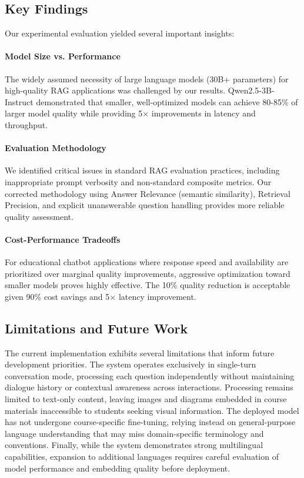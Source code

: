 \documentclass[12pt,a4paper]{article}
\begin{document}
\subsection{Key Findings}
Our experimental evaluation yielded several important insights:

\paragraph{Model Size vs. Performance} The widely assumed necessity of large language models (30B+ parameters) for high-quality RAG applications was challenged by our results. Qwen2.5-3B-Instruct demonstrated that smaller, well-optimized models can achieve 80-85\% of larger model quality while providing 5$\times$ improvements in latency and throughput.

\paragraph{Evaluation Methodology} We identified critical issues in standard RAG evaluation practices, including inappropriate prompt verbosity and non-standard composite metrics. Our corrected methodology using Answer Relevance (semantic similarity), Retrieval Precision, and explicit unanswerable question handling provides more reliable quality assessment.

\paragraph{Cost-Performance Tradeoffs} For educational chatbot applications where response speed and availability are prioritized over marginal quality improvements, aggressive optimization toward smaller models proves highly effective. The 10\% quality reduction is acceptable given 90\% cost savings and 5$\times$ latency improvement.

\subsection{Limitations and Future Work}
The current implementation exhibits several limitations that inform future development priorities. The system operates exclusively in single-turn conversation mode, processing each question independently without maintaining dialogue history or contextual awareness across interactions. Processing remains limited to text-only content, leaving images and diagrams embedded in course materials inaccessible to students seeking visual information. The deployed model has not undergone course-specific fine-tuning, relying instead on general-purpose language understanding that may miss domain-specific terminology and conventions. Finally, while the system demonstrates strong multilingual capabilities, expansion to additional languages requires careful evaluation of model performance and embedding quality before deployment.
\end{document}
